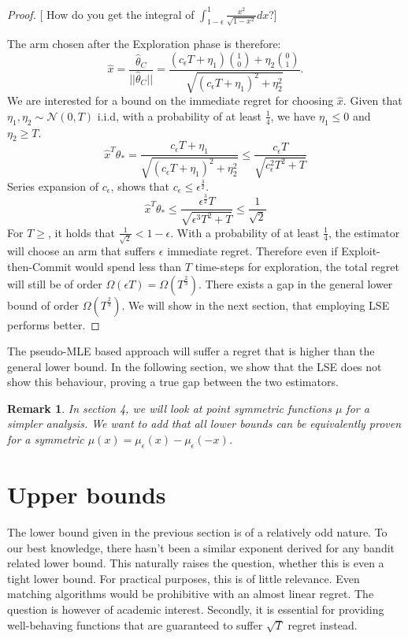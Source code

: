 \documentclass[twoside]{article} \usepackage{aistats2017}
\newtheorem{remark}{Remark}
\newcommand{\shuai}[1]{{\color{blue!50!black} [\text{Shuai:} #1]}}
\begin{document}
\begin{proof}
    \shuai{How do you get the integral of $\int_{1-\epsilon}^{1} \frac{x^2}{\sqrt{1-x^2}}dx$?}
    
    The arm chosen after the Exploration phase is therefore:
    $$\hat{x} = \frac{\hat{\theta}_C}{||\hat{\theta}_C||}=\frac{(c_\epsilon T+\eta_1)\binom{1}{0}+\eta_2\binom{0}{1}}{\sqrt{(c_\epsilon T+\eta_1)^2+\eta_2^2}}.$$
    We are interested for a bound on the immediate regret for choosing $\hat{x}$. Given that $\eta_1,\eta_2\sim \mathcal{N}(0,T)$ i.i.d, with a probability of at least $\frac{1}{4}$, we have $\eta_1\leq0$ and $\eta_2 \geq T$.
    $$
    \hat{x}^T\theta_* = \frac{c_\epsilon T+\eta_1}{\sqrt{(c_\epsilon T+\eta_1)^2+\eta_2^2}}\leq \frac{c_\epsilon T}{\sqrt{c^2_\epsilon T^2 + T}}
    $$
    Series expansion of $c_\epsilon$, shows that $c_\epsilon\leq\epsilon^{\frac{3}{2}}$.
    $$
    \hat{x}^T\theta_*\leq \frac{\epsilon^{\frac{3}{2}}T}{\sqrt{\epsilon^3T^2+T}}\leq \frac{1}{\sqrt{2}}
    $$
    For $T\geq $, it holds that $\frac{1}{\sqrt{2}}<1-\epsilon$. With a probability of at least $\frac{1}{4}$, the estimator will choose an arm that suffers $\epsilon$ immediate regret. Therefore even if Exploit-then-Commit would spend less than $T$ time-steps for exploration, the total regret will still be of order $\Omega(\epsilon T)=\Omega (T^{\frac{2}{3}})$. There exists a gap in the general lower bound of order $\Omega (T^{\frac{2}{3}})$. We will show in the next section, that employing LSE performs better.
    
    
    
    
\end{proof}

The pseudo-MLE based approach will suffer a regret that is higher than the general lower bound. In the following section, we show that the LSE does not show this behaviour, proving a true gap between the two estimators.
\begin{remark}
In section 4, we will look at point symmetric functions $\mu$ for a simpler analysis. We want to add that all lower bounds can be equivalently proven for a symmetric $\mu(x) = \mu_\epsilon(x)-\mu_\epsilon(-x)$.
\end{remark}
\section{Upper bounds}\label{upperBounds}
The lower bound given in the previous section is of a relatively odd nature. 
To our best knowledge, there hasn't been a similar exponent derived for any bandit related lower bound.
This naturally raises the question, whether this is even a tight lower bound.
For practical purposes, this is of little relevance. Even matching algorithms would be prohibitive with an almost linear regret. The question is however of academic interest.
Secondly, it is essential for providing well-behaving functions that are guaranteed to suffer $\sqrt{T}$ regret instead.
\end{document}
